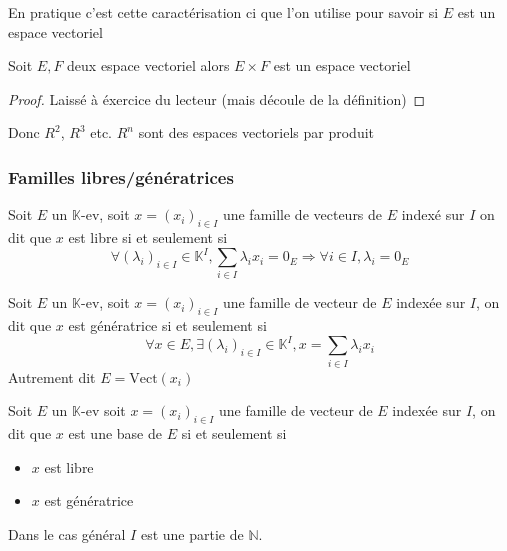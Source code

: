 \documentclass[11pt,colorlinks]{book}
\theoremstyle{mytheoremstyle}
\theoremstyle{mytheoremstyle}
\theoremstyle{mytheoremstyle}
\theoremstyle{mytheoremstyle}
\theoremstyle{mytheoremstyle}
\theoremstyle{mytheoremstyle}
\theoremstyle{mytheoremstyle}
\theoremstyle{mytheoremstyle}
\theoremstyle{myproblemstyle}
\def\mbb#1{\mathbb{#1}}
\def\bN{\mbb{N}}
\def\bK{\mbb{K}}
\def\ev{espace vectoriel }
\begin{document}
\begin{rmq}
  En pratique c'est cette caractérisation ci que l'on utilise pour savoir si $E$ est un espace vectoriel
\end{rmq}
\begin{prop}
  Soit $E,F$ deux \ev alors $E \times F$ est un \ev 
  \begin{proof}
    Laissé à éxercice du lecteur (mais découle de la définition)
  \end{proof}
\end{prop}
\begin{rmq}
  Donc $R^2$, $R^3$ etc. $R^n$ sont des espaces vectoriels par produit
\end{rmq}
\subsubsection{Familles libres/génératrices}
\begin{definition}
  Soit $E$ un $\bK$-ev, soit $x = (x_i)_{i \in I}$ une famille de vecteurs de $E$ indexé sur $I$
  on dit que $x$ est libre si et seulement si 
  \begin{equation*}
    \forall (\lambda_i)_{i \in I} \in \bK^I, \sum_{i\in I} \lambda_i x_i = 0_E \Rightarrow \forall i \in I, \lambda_i = 0_E
  \end{equation*}
\end{definition}
\begin{definition}
  Soit $E$ un $\bK$-ev, soit $x = (x_i)_{i \in I}$ une famille de vecteur de $E$ indexée sur $I$, 
  on dit que $x$ est génératrice si et seulement si 
  \begin{equation*}
    \forall x \in E, \exists (\lambda_i)_{i \in I} \in \bK^I, x = \sum_{i\in I} \lambda_i x_i
  \end{equation*}
  Autrement dit $E = \text{Vect}(x_i)$
\end{definition}
\begin{definition}
  Soit $E$ un $\bK$-ev soit $x = (x_i)_{i \in I}$ une famille de vecteur de $E$ indexée sur $I$, on dit que $x$ est 
  une base de $E$ si et seulement si 
  \begin{itemize}
    \item $x$ est libre 
    \item $x$ est génératrice
  \end{itemize}
\end{definition}
\begin{rmq}
  Dans le cas général $I$ est une partie de $\bN$.
\end{rmq}
\end{document}
